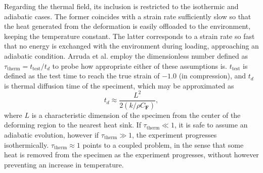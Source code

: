 Regarding the thermal field, its inclusion is restricted to the isothermic and adiabatic cases.
The former coincides with a strain rate sufficiently slow so that the heat generated from the deformation is easily offloaded to the environment, keeping the temperature constant.
The latter corresponds to a strain rate so fast that no energy is exchanged with the environment during loading, approaching an adiabatic condition.
Arruda et al. \citep{arrudaEffectsStrainRate1995} employ the dimensionless number defined as $\tau_\text{therm} = t_\text{test}/t_d$ to probe how appropriate either of these assumptions is.
$t_\text{test}$ is defined as the test time to reach the true strain of $-1.0$ (in compression), and $t_d$ is thermal diffusion time of the speciment, which may be approximated as
\begin{equation}
  t_d \approx \frac{L^2}{2(k/\rho C_\mathbf{F})},
\end{equation}
where $L$ is a characteristic dimension of the specimen from the center of the deforming region to the nearest heat sink.
If $\tau_\text{therm} \ll 1$, it is safe to assume an adiabatic evolution, however if $\tau_\text{therm}\gg 1$, the experiment progresses isothermically.
$\tau_\text{therm}\approx 1$ points to  a coupled problem, in the sense that some heat is removed from the specimen as the experiment progresses, without however preventing an increase in temperature.

\subsection{\cite{haoUnifiedAmorphousCrystalline2022}}

